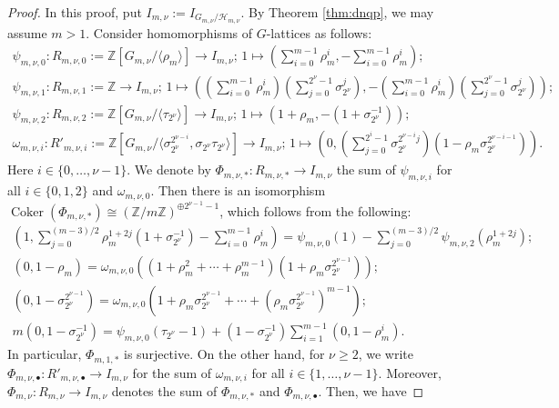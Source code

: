 \documentclass[10pt,a4paper]{amsart}
\newcommand{\Z}{\mathbb{Z}}
\newcommand{\cH}{\mathcal{H}}
\DeclareMathOperator{\Coker}{Coker}
\begin{document}
\begin{proof}
In this proof, put $I_{m,\nu}:=I_{G_{m,\nu}/\cH_{m,\nu}}$. By Theorem \ref{thm:dnqp}, we may assume $m>1$. Consider homomorphisms of $G$-lattices as follows: 
\begin{gather*}
\psi_{m,\nu,0}\colon R_{m,\nu,0}:=\Z[G_{m,\nu}/\langle \rho_{m} \rangle]\rightarrow I_{m,\nu};\,1\mapsto \left(\sum_{i=0}^{m-1}\rho_{m}^{i},-\sum_{i=0}^{m-1}\rho_{m}^{i} \right);\\
\psi_{m,\nu,1}\colon R_{m,\nu,1}:=\Z \rightarrow I_{m,\nu};\,1\mapsto \left(\left(\sum_{i=0}^{m-1}\rho_{m}^{i}\right)\left(\sum_{j=0}^{2^{\nu}-1}\sigma_{2^{\nu}}^{j}\right),-\left(\sum_{i=0}^{m-1}\rho_{m}^{i}\right)\left(\sum_{j=0}^{2^{\nu}-1}\sigma_{2^{\nu}}^{j}\right) \right);\\
\psi_{m,\nu,2}\colon R_{m,\nu,2}:=\Z[G_{m,\nu}/\langle \tau_{2^{\nu}} \rangle]\rightarrow I_{m,\nu};\,1\mapsto (1+\rho_{m},-(1+\sigma_{2^{\nu}}^{-1}));\\
\omega_{m,\nu,i}\colon R'_{m,\nu,i}:=\Z[G_{m,\nu}/\langle \sigma_{2^{\nu}}^{2^{\nu-i}}, \sigma_{2^{\nu}} \tau_{2^{\nu}} \rangle]\rightarrow I_{m,\nu};\,1\mapsto \left(0,\left(\sum_{j=0}^{2^{i}-1}\sigma_{2^{\nu}}^{2^{\nu-i}j}\right)(1-\rho_{m}\sigma_{2^{\nu}}^{2^{\nu-i-1}}) \right). 
\end{gather*}
Here $i\in \{0,\ldots,\nu-1\}$. We denote by $\Phi_{m,\nu,\ast}\colon R_{m,\nu,\ast}\rightarrow I_{m,\nu}$ the sum of $\psi_{m,\nu,i}$ for all $i\in \{0,1,2\}$ and $\omega_{m,\nu,0}$. Then there is an isomorphism $\Coker(\Phi_{m,\nu,\ast})\cong (\Z/m\Z)^{\oplus 2^{\nu-1}-1}$, which follows from the following: 
\begin{gather*}
\left(1,\sum_{j=0}^{(m-3)/2}\rho_{m}^{1+2j}(1+\sigma_{2^{\nu}}^{-1})-\sum_{i=0}^{m-1}\rho_{m}^{i}\right)=\psi_{m,\nu,0}(1)-\sum_{j=0}^{(m-3)/2}\psi_{m,\nu,2}(\rho_{m}^{1+2j});\\
(0,1-\rho_{m})=\omega_{m,\nu,0}((1+\rho_{m}^{2}+\cdots+\rho_{m}^{m-1})(1+\rho_{m}\sigma_{2^{\nu}}^{2^{\nu-1}}));\\
(0,1-\sigma_{2^{\nu}}^{2^{\nu-1}})=\omega_{m,\nu,0}(1+\rho_{m}\sigma_{2^{\nu}}^{2^{\nu-1}}+\cdots +(\rho_{m}\sigma_{2^{\nu}}^{2^{\nu-1}})^{m-1});\\
m(0,1-\sigma_{2^{\nu}}^{-1})=\psi_{m,\nu,0}(\tau_{2^{\nu}}-1)+(1-\sigma_{2^{\nu}}^{-1})\sum_{i=1}^{m-1}(0,1-\rho_{m}^{i}). 
\end{gather*}
In particular, $\Phi_{m,1,\ast}$ is surjective. On the other hand, for $\nu \geq 2$, we write $\Phi_{m,\nu,\bullet}\colon R'_{m,\nu,\bullet}\rightarrow I_{m,\nu}$ for the sum of $\omega_{m,\nu,i}$ for all $i\in \{1,\ldots,\nu-1\}$. Moreover, $\Phi_{m,\nu} \colon R_{m,\nu}\rightarrow I_{m,\nu}$ denotes the sum of $\Phi_{m,\nu,\ast}$ and $\Phi_{m,\nu,\bullet}$. Then, we have

\end{proof}
\end{document}
